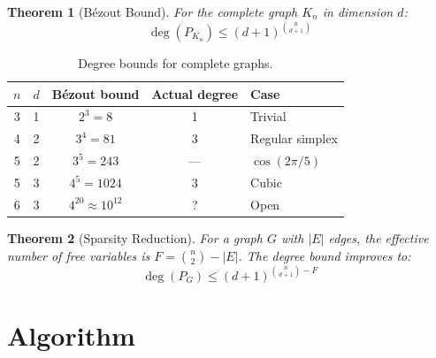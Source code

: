 \documentclass[11pt]{article}
\newtheorem{theorem}{Theorem}[section]
\theoremstyle{definition}
\begin{document}
\begin{theorem}[B\'{e}zout Bound]\label{thm:bezout}
For the complete graph $K_n$ in dimension $d$:
\begin{equation}
\deg(P_{K_n}) \le (d+1)^{\binom{n}{d+1}}
\end{equation}
\end{theorem}

\begin{table}[h]
\centering
\begin{tabular}{ccccl}
\hline
$n$ & $d$ & B\'{e}zout bound & Actual degree & Case \\
\hline
3 & 1 & $2^3 = 8$ & 1 & Trivial \\
4 & 2 & $3^4 = 81$ & 3 & Regular simplex \\
5 & 2 & $3^5 = 243$ & --- & $\cos(2\pi/5)$ \\
5 & 3 & $4^5 = 1024$ & 3 & Cubic \\
6 & 3 & $4^{20} \approx 10^{12}$ & ? & Open \\
\hline
\end{tabular}
\caption{Degree bounds for complete graphs.}
\end{table}

\begin{theorem}[Sparsity Reduction]
For a graph $G$ with $|E|$ edges, the effective number of free variables is
$F = \binom{n}{2} - |E|$. The degree bound improves to:
\begin{equation}
\deg(P_G) \le (d+1)^{\binom{n}{d+1} - F}
\end{equation}
\end{theorem}

\section{Algorithm}
\end{document}
